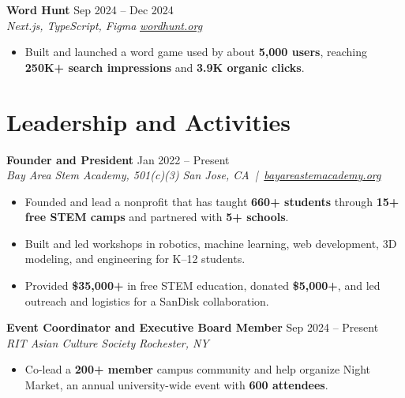 \documentclass[10pt,letterpaper]{article}
\newif\ifresumeFirstRole
\newcommand{\resumeRole}[4]{%
  \ifresumeFirstRole
    \global\resumeFirstRolefalse
  \else
    \vspace{0pt plus 1fill}%
  \fi
  \textbf{#1} \hfill #2\\
  \textit{#3} \hfill \textit{#4}
}
\begin{document}
\resumeRole{Word Hunt}{Sep 2024 -- Dec 2024}{Next.js, TypeScript, Figma}{\href{https://wordhunt.org}{wordhunt.org}}
\begin{itemize}
  \item Built and launched a word game used by about \textbf{5,000 users}, reaching \textbf{250K+ search impressions} and \textbf{3.9K organic clicks}.
\end{itemize}

\section*{Leadership and Activities}
\resumeRole{Founder and President}{Jan 2022 -- Present}{Bay Area Stem Academy, 501(c)(3)}{San Jose, CA \,|\, \href{https://bayareastemacademy.org}{bayareastemacademy.org}}
\begin{itemize}
  \item Founded and lead a nonprofit that has taught \textbf{660+ students} through \textbf{15+ free STEM camps} and partnered with \textbf{5+ schools}.
  \item Built and led workshops in robotics, machine learning, web development, 3D modeling, and engineering for K--12 students.
  \item Provided \textbf{\$35,000+} in free STEM education, donated \textbf{\$5,000+}, and led outreach and logistics for a SanDisk collaboration.
\end{itemize}

\resumeRole{Event Coordinator and Executive Board Member}{Sep 2024 -- Present}{RIT Asian Culture Society}{Rochester, NY}
\begin{itemize}
  \item Co-lead a \textbf{200+ member} campus community and help organize Night Market, an annual university-wide event with \textbf{600 attendees}.
\end{itemize}
\end{document}
